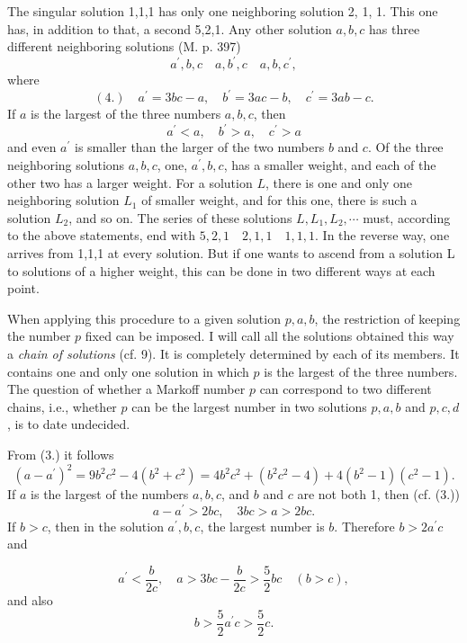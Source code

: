 \documentclass[12pt]{article}
\begin{document}
The singular solution 1,1,1 has only one neighboring solution 2, 1, 1. This one has, in addition to that, a second 5,2,1. Any other solution $a, b, c$ has three different neighboring solutions (M. p. 397)
$$a^{\prime}, b, c \quad a, b^{\prime}, c \quad a, b, c^{\prime},$$
where
$$
(4.) \quad a^{\prime}=3 b c-a, \quad b^{\prime}=3 a c-b, \quad c^{\prime}=3 a b-c.
$$
If $a$ is the largest of the three numbers $a, b, c$, then
$$
a^{\prime}<a, \quad b^{\prime}>a, \quad c^{\prime}>a
$$
and even $a^{\prime}$ is smaller than the larger of the two numbers $b$ and $c$. Of the three neighboring solutions $a, b, c$, one, $a^{\prime}, b, c$, has a smaller weight, and each of the other two has a larger weight. For a solution $L$, there is one and only one neighboring solution $L_{1}$ of smaller weight, and for this one, there is such a solution $L_{2}$, and so on. The series of these solutions $L, L_{1}, L_{2}, \cdots$ must, according to the above statements, end with $5,2,1 \quad 2,1,1 \quad 1,1,1$. In the reverse way, one arrives from 1,1,1 at every solution. But if one wants to ascend from a solution L to solutions of a higher weight, this can be done in two different ways at each point.

When applying this procedure to a given solution $p, a, b$, the restriction of keeping the number $p$ fixed can be imposed. I will call all the solutions obtained this way a \textit{chain of solutions} (cf.  9). It is completely determined by each of its members. It contains one and only one solution in which $p$ is the largest of the three numbers. The question of whether a Markoff number $p$ can correspond to two different chains, i.e., whether $p$ can be the largest number in two solutions $p, a, b$ and $p, c, d$, is to date undecided.

From (3.) it follows
$$
\left(a-a^{\prime}\right)^{2}=9 b^{2} c^{2}-4\left(b^{2}+c^{2}\right)=4 b^{2} c^{2}+\left(b^{2} c^{2}-4\right)+4\left(b^{2}-1\right)\left(c^{2}-1\right) .
$$
If $a$ is the largest of the numbers $a, b, c$, and $b$ and $c$ are not both 1, then (cf. (3.))
$$
a-a^{\prime}>2 b c, \quad 3 b c>a>2 b c .
$$
If $b>c$, then in the solution $a^{\prime}, b, c$, the largest number is $b$. Therefore $b>2a^{\prime}c$ and

\begin{equation*}
a^{\prime}<\frac{b}{2 c}, \quad a>3 b c-\frac{b}{2 c}>\frac{5}{2} b c \quad(b>c), \tag{6.}
\end{equation*}
and also
\begin{equation*}
b>\frac{5}{2} a^{\prime} c>\frac{5}{2} c . \tag{7.}
\end{equation*}
\end{document}
